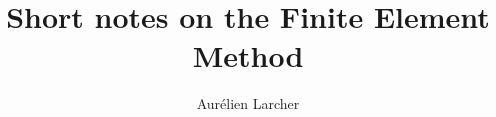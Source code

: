\documentclass[a4paper]{tmanotes}
\begin{document}
\title{Short notes on the Finite Element Method}
\author{Aurélien Larcher}

\date{}

\maketitle

\newpage

\tableofcontents


\newpage


\newpage
\makenomenclature
\printnomenclature

\newpage


\newpage


\newpage


\newpage


\newpage
%

\newpage
%

\newpage
%

\newpage
%
\end{document}
